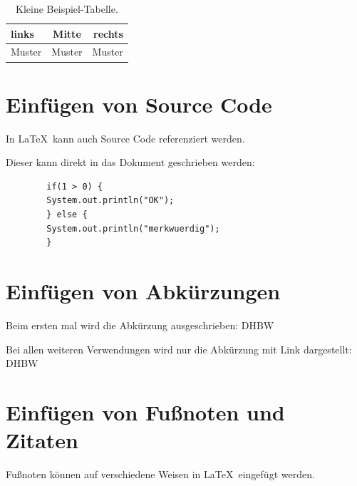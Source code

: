 \begin{table}[htb]
    \centering
    \begin{tabular}{lcr}
        links & Mitte & rechts \\
        \hline
        Muster & Muster & Muster \\
    \end{tabular}
    \caption{Kleine Beispiel-Tabelle.}
    \label{tab:BeispielTabelleKlein}
\end{table}

\section{Einfügen von Source Code}\label{section:source_code}

\lstset{language=Java}

    In \LaTeX\ kann auch Source Code referenziert werden.

    Dieser kann direkt in das Dokument geschrieben werden:

    \begin{lstlisting}
        if(1 > 0) {
        System.out.println("OK"); 
        } else {
        System.out.println("merkwuerdig");
        }
    \end{lstlisting}

\section{Einfügen von Abkürzungen}\label{section:abkuerzungen}

Beim ersten mal wird die Abkürzung ausgeschrieben: \ac{DHBW}

Bei allen weiteren Verwendungen wird nur die Abkürzung mit Link dargestellt: \ac{DHBW}

\section{Einfügen von Fußnoten und Zitaten}\label{section:zitate}

Fußnoten können auf verschiedene Weisen in \LaTeX\ eingefügt werden.

